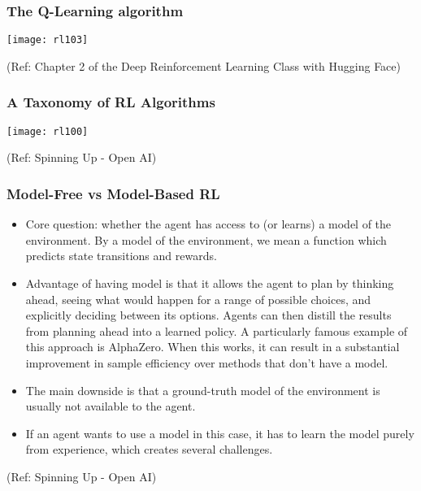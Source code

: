 \begin{frame}[fragile]\frametitle{The Q-Learning algorithm}


\begin{center}
\texttt{[image: rl103]}
\end{center}

{\tiny (Ref: Chapter 2 of the Deep Reinforcement Learning Class with Hugging Face)}

\end{frame}

\begin{frame}[fragile]\frametitle{A Taxonomy of RL Algorithms}

\begin{center}
\texttt{[image: rl100]}
\end{center}

{\tiny (Ref: Spinning Up - Open AI)}
\end{frame}

\begin{frame}[fragile]\frametitle{Model-Free vs Model-Based RL}

\begin{itemize}
\item Core question: whether the agent has access to (or learns) a model of the environment. By a model of the environment, we mean a function which predicts state transitions and rewards.
\item Advantage of having model is that it allows the agent to plan by thinking ahead, seeing what would happen for a range of possible choices, and explicitly deciding between its options. Agents can then distill the results from planning ahead into a learned policy. A particularly famous example of this approach is AlphaZero. When this works, it can result in a substantial improvement in sample efficiency over methods that don’t have a model.
\item The main downside is that a ground-truth model of the environment is usually not available to the agent. 
\item If an agent wants to use a model in this case, it has to learn the model purely from experience, which creates several challenges. 

\end{itemize}

{\tiny (Ref: Spinning Up - Open AI)}
\end{frame}

